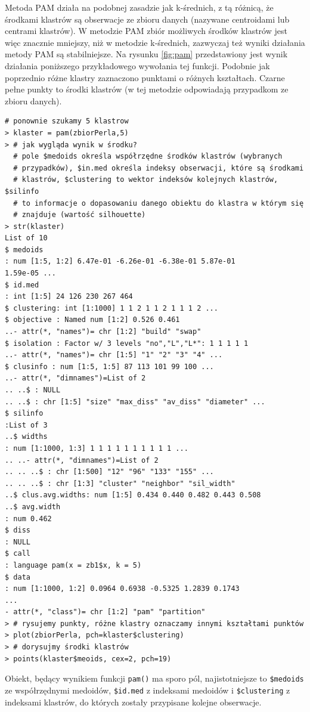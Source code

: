 \documentclass[polish,]{book}
\begin{document}
Metoda PAM działa na podobnej zasadzie jak k-średnich, z tą różnicą, że środkami klastrów są obserwacje ze zbioru danych (nazywane centroidami lub centrami
klastrów). W metodzie PAM zbiór możliwych środków klastrów jest więc znacznie
mniejszy, niż w metodzie k-średnich, zazwyczaj też wyniki działania metody PAM
są stabilniejsze. Na rysunku \ref{fig:pam} przedstawiony jest wynik działania poniższego przykładowego wywołania tej funkcji. Podobnie jak poprzednio różne klastry zaznaczono
punktami o różnych kształtach. Czarne pełne punkty to środki klastrów (w tej metodzie odpowiadają przypadkom ze zbioru danych).

\begin{verbatim}
# ponownie szukamy 5 klastrow
> klaster = pam(zbiorPerla,5)
> # jak wygląda wynik w środku?
  # pole $medoids określa współrzędne środków klastrów (wybranych
  # przypadków), $in.med określa indeksy obserwacji, które są środkami
  # klastrów, $clustering to wektor indeksów kolejnych klastrów, $silinfo
  # to informacje o dopasowaniu danego obiektu do klastra w którym się
  # znajduje (wartość silhouette)
> str(klaster)
List of 10
$ medoids
: num [1:5, 1:2] 6.47e-01 -6.26e-01 -6.38e-01 5.87e-01
1.59e-05 ...
$ id.med
: int [1:5] 24 126 230 267 464
$ clustering: int [1:1000] 1 1 2 1 1 2 1 1 1 2 ...
$ objective : Named num [1:2] 0.526 0.461
..- attr(*, "names")= chr [1:2] "build" "swap"
$ isolation : Factor w/ 3 levels "no","L","L*": 1 1 1 1 1
..- attr(*, "names")= chr [1:5] "1" "2" "3" "4" ...
$ clusinfo : num [1:5, 1:5] 87 113 101 99 100 ...
..- attr(*, "dimnames")=List of 2
.. ..$ : NULL
.. ..$ : chr [1:5] "size" "max_diss" "av_diss" "diameter" ...
$ silinfo
:List of 3
..$ widths
: num [1:1000, 1:3] 1 1 1 1 1 1 1 1 1 1 ...
.. ..- attr(*, "dimnames")=List of 2
.. .. ..$ : chr [1:500] "12" "96" "133" "155" ...
.. .. ..$ : chr [1:3] "cluster" "neighbor" "sil_width"
..$ clus.avg.widths: num [1:5] 0.434 0.440 0.482 0.443 0.508
..$ avg.width
: num 0.462
$ diss
: NULL
$ call
: language pam(x = zb1$x, k = 5)
$ data
: num [1:1000, 1:2] 0.0964 0.6938 -0.5325 1.2839 0.1743
...
- attr(*, "class")= chr [1:2] "pam" "partition"
> # rysujemy punkty, różne klastry oznaczamy innymi kształtami punktów
> plot(zbiorPerla, pch=klaster$clustering)
> # dorysujmy środki klastrów
> points(klaster$meoids, cex=2, pch=19)
\end{verbatim}

Obiekt, będący wynikiem funkcji \texttt{pam()} ma sporo pól, najistotniejsze to \texttt{\$medoids}
ze współrzędnymi medoidów, \texttt{\$id.med} z indeksami medoidów i \texttt{\$clustering} z indeksami klastrów, do których zostały przypisane kolejne obserwacje.
\end{document}

